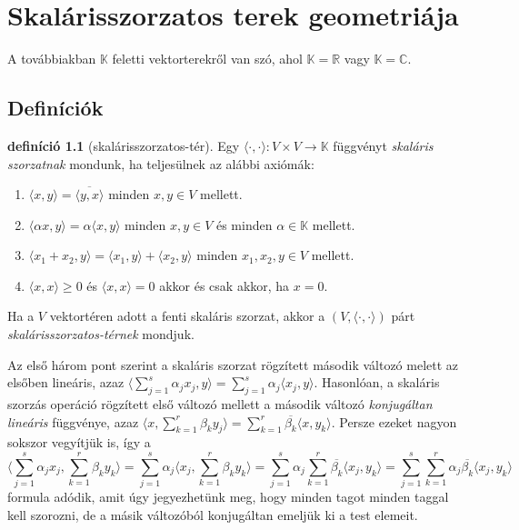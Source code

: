 \documentclass[a4paper, showtrims]{memoir}
\theoremstyle{plain}
\theoremstyle{remark}
\theoremstyle{definition}
\newtheorem{definition}[proposition]{definíció}
\newcommand{\ip}[2]{\langle#1,#2\rangle}
\begin{document}
\chapter{Skalárisszorzatos terek geometriája}
A továbbiakban $\mathbb{K}$ feletti vektorterekről van szó,
ahol $\mathbb{K}=\mathbb{R}$ vagy $\mathbb{K}=\mathbb{C}$.
\section{Definíciók}

\begin{definition}[skalárisszorzatos-tér]
	Egy $\ip{\cdot}{\cdot}:V\times V\to \mathbb{K}$ függvényt \emph{skaláris szorzatnak} mondunk, ha
	teljesülnek az alábbi axiómák:
	\begin{enumerate}
		\item $\ip{x}{y}=\overline{\ip{y}{x}}$ minden $x,y\in V$ mellett.
		\item
		      $\ip{\alpha x}{y}=
			      \alpha\ip{x}{y}$ minden $x,y\in V$ és minden $\alpha\in \mathbb{K}$ mellett.
		\item
		      $\ip{x_1+x_2}{y}=
			      \ip{x_1}{y}+\ip{x_2}{y}$ minden $x_1,x_2,y\in V$ mellett.
		\item
		      $\ip{x}{x}\geq 0$ és $\ip{x}{x}=0$ akkor és csak akkor, ha $x=0$.
	\end{enumerate}
	Ha a $V$ vektortéren adott a fenti skaláris szorzat,
	akkor a $\left( V,\ip{\cdot}{\cdot} \right)$ párt \emph{skalárisszorzatos-térnek} mondjuk.
\end{definition}
Az első három pont szerint a skaláris szorzat rögzített második változó melett az elsőben lineáris, azaz
$
	\ip{\sum_{j=1}^s\alpha_jx_j}{y}
	=
	\sum_{j=1}^s\alpha_j\ip{x_j}{y}$.
Hasonlóan, a skaláris szorzás operáció rögzített első változó mellett a második változó
\emph{konjugáltan lineáris} függvénye,
azaz
\begin{math}
	\ip{x}{\sum_{k=1}^r\beta_ky_j}
	=
	\sum_{k=1}^r\overline{\beta_k}\ip{x}{y_k}.
\end{math}
Persze ezeket nagyon sokszor vegyítjük is,
így a
\[
	\ip{\sum_{j=1}^s\alpha_jx_j}{\sum_{k=1}^r\beta_ky_k}
	=
	\sum_{j=1}^s\alpha_j\ip{x_j}{\sum_{k=1}^r\beta_ky_k}
	=
	\sum_{j=1}^s\alpha_j\sum_{k=1}^r\overline{\beta_k}\ip{x_j}{y_k}
	=
	\sum_{j=1}^s\sum_{k=1}^r\alpha_j\overline{\beta_k}\ip{x_j}{y_k}
\]
formula adódik, amit úgy jegyezhetünk meg, hogy minden tagot minden taggal kell szorozni,
de a másik változóból konjugáltan emeljük ki a test elemeit.
\end{document}
